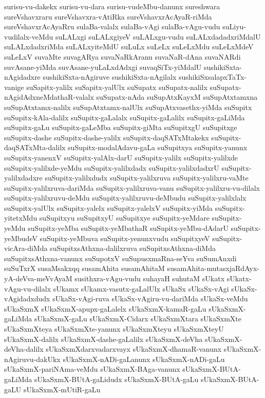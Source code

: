 {surisu-vu-dakekx
surisu-vu-dara
surisu-vudeMbu-danunx
sureshwara
sureVshavxraru
sureVshavxra-vAtiRka
sureVshavxrAcAyaR-riMda
sureVshavxrAcAyaRru
sulaBa-valalx
sulaBa-vAgi
sulaBa-vAgu-vudu
suLiyu-vudilalx-veMdu
suLALxgi
suLALxgiyeV
suLALxgu-vudu
suLALxdadadxriMdalU
suLALxdadxriMda
suLALxyiteMdU
suLuLx
suLeLx
suLeLxMdu
suLeLxMdeV
suLeLxV
suvaMte
suvagARya
suvaNaRkAranu
suvaNaR-dAna
suvaNARdi
suvAsane-yiMda
suvAsane-yuLaLxdAdxgi
suvaqSiTx-yiMdalU
sushikiSxta-nAgidadxre
sushikiSxta-nAgiruve
sushikiSxta-nAgilalx
sushikiSxsalapxTaTx-vanige
suSapitx-yalilx
suSapitx-yalUlx
suSupatx
suSupatx-nalilx
suSupatx-nAgidAdxneMdathaR-valalx
suSupatx-nAda
suSupAtxKayxM
suSupAtxtamxna
suSupAtxtamx-nalilx
suSupAtxtamx-nalUlx
suSupAtxvasethx-yiMda
suSupitx
suSupitx-kAla-dalilx
suSupitx-gaLalalx
suSupitx-gaLalilx
suSupitx-gaLiMda
suSupitx-gaLu
suSupitx-gaLeMba
suSupitx-giMta
suSupitxgU
suSupitxge
suSupitx-dashe
suSupitx-dashe-yalilx
suSupitx-daqSATxMtakekx
suSupitx-daqSATxMta-dalilx
suSupitx-modalAdavu-gaLa
suSupitxya
suSupitx-yanunx
suSupitx-yanenxV
suSupitx-yalAlx-darU
suSupitx-yalilx
suSupitx-yalilxde
suSupitx-yalilxde-yeMdu
suSupitx-yalilxdadx
suSupitx-yalilxdadxrU
suSupitx-yalilxdadxre
suSupitx-yalilxdudx
suSupitx-yalilxruva
suSupitx-yalilxru-vaMte
suSupitx-yalilxruva-dariMda
suSupitx-yalilxruva-vanu
suSupitx-yalilxru-vu-dilalx
suSupitx-yalilxruvu-deMdu
suSupitx-yalilxruvu-deMbudu
suSupitx-yalilxlalx
suSupitx-yalUlx
suSupitx-yalelx
suSupitx-yalelxV
suSupitx-yiMda
suSupitx-yitetxMdu
suSupitxyu
suSupitxyU
suSupitxye
suSupitx-yeMdare
suSupitx-yeMdu
suSupitx-yeMba
suSupitx-yeMbathaR
suSupitx-yeMbu-dAdarU
suSupitx-yeMbudeV
suSupitx-yeMbuva
suSupitx-yenunxvudu
suSupitxyeV
suSupitx-vicAra-diMda
suSupitxsAthxna-dalilxruva
suSupitxsAthxna-diMda
suSupitxsAthxna-vanunx
suSupotxV
suSupusxmaRna-seYva
suSumAnxdi
suSuTxrX
susaMsakxqq
susamAhita
susamAhitaM
susamAhita-mutasxjaRdAyx-yA-deVva-meVvAyaM
susithxra-vAgu-vudu
suhayaH
suhutaM
sUkatx
sUkatx-vAgu-vu-dilalx
sUkamx
sUkamx-vasutx-gaLalUlx
sUkaSx
sUkaSx-vAgi
sUkaSx-vAgidadxdudx
sUkaSx-vAgi-ruva
sUkaSx-vAgiru-vu-dariMda
sUkaSx-veMdu
sUkaSxmX
sUkaSxmX-apupx-gaLalelx
sUkaSxmX-kamaR-gaLu
sUkaSxmX-gaLiMda
sUkaSxmX-gaLu
sUkaSxmX-Cidarx
sUkaSxmXtara
sUkaSxmXte
sUkaSxmXteya
sUkaSxmXte-yanunx
sUkaSxmXteyu
sUkaSxmXteyU
sUkaSxmX-dalilx
sUkaSxmX-dashe-gaLalilx
sUkaSxmX-deVha
sUkaSxmX-deVha-dalilx
sUkaSxmXdarxvadarxvayx
sUkaSxmX-dhamaR-vanunx
sUkaSxmX-nAgiruvu-dakUkx
sUkaSxmX-nADi-gaLanunx
sUkaSxmX-nADi-gaLu
sUkaSxmX-pariNAma-veMdu
sUkaSxmX-BAga-vanunx
sUkaSxmX-BUtA-gaLiMda
sUkaSxmX-BUtA-gaLidudx
sUkaSxmX-BUtA-gaLu
sUkaSxmX-BUtA-gaLU
sUkaSxmX-mUtiR-gaLu
}
